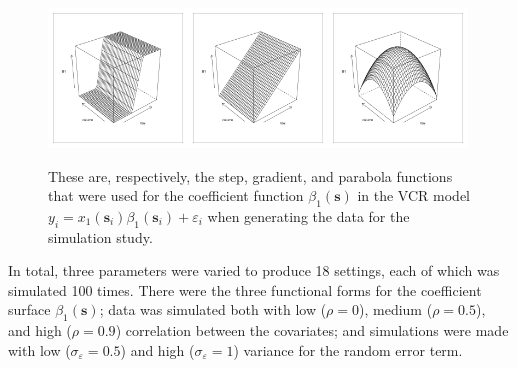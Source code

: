 \documentclass[authoryear,review, 12pt]{elsarticle}
\begin{document}
\begin{figure}
\includegraphics[width=0.33\textwidth]{0_Users_wesley_git_gwr_figures_simulation_step.pdf}\includegraphics[width=0.33\textwidth]{1_Users_wesley_git_gwr_figures_simulation_gradient.pdf}\includegraphics[width=0.33\textwidth]{2_Users_wesley_git_gwr_figures_simulation_parabola.pdf}

\protect\caption{These are, respectively, the step, gradient, and parabola functions
that were used for the coefficient function $\beta_{1}(\bm{s})$ in
the VCR model $y_{i}=x_{1}(\bm{s}_{i})\beta_{1}(\bm{s}_{i})+\varepsilon_{i}$
when generating the data for the simulation study.\label{fig:simulation-coefficient-functions}}
\end{figure}


In total, three parameters were varied to produce 18 settings, each
of which was simulated 100 times. There were the three functional
forms for the coefficient surface $\beta_{1}(\bm{s})$; data was simulated
both with low ($\rho=0$), medium ($\rho=0.5$), and high ($\rho=0.9$)
correlation between the covariates; and simulations were made with
low ($\sigma_{\varepsilon}=0.5$) and high ($\sigma_{\varepsilon}=1$)
variance for the random error term.
\end{document}
